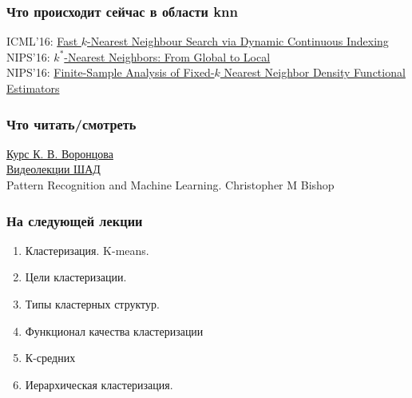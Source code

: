 \documentclass[10pt]{beamer}
\begin{document}
\begin{frame}\frametitle{Что происходит сейчас в области knn}
  ICML'16: \href{http://jmlr.org/proceedings/papers/v48/lic16.pdf}{Fast $k$-Nearest Neighbour Search via Dynamic Continuous Indexing}\\
  \bigbreak
  NIPS'16: \href{http://papers.nips.cc/paper/6373-k-nearest-neighbors-from-global-to-local.pdf}{$k^\ast$-Nearest Neighbors: From Global to Local}\\
  \bigbreak
  NIPS'16: \href{http://papers.nips.cc/paper/6123-finite-sample-analysis-of-fixed-k-nearest-neighbor-density-functional-estimators.pdf}{Finite-Sample Analysis of Fixed-$k$ Nearest Neighbor Density Functional Estimators}\\
\end{frame}

\begin{frame}\frametitle{Что читать/смотреть}
	\href{http://www.machinelearning.ru/wiki/images/6/6d/Voron-ML-1.pdf}{Курс К. В. Воронцова}\\
	\href{https://yandexdataschool.ru/edu-process/courses/machine-learning}{Видеолекции ШАД}\\
	Pattern Recognition and Machine Learning. Christopher M Bishop
\end{frame}

\begin{frame}\frametitle{На следующей лекции}
	\begin{enumerate} [--]
		\item Кластеризация.  K-means.
		\item Цели кластеризации.
		\item Типы кластерных структур.
		\item Функционал качества кластеризации
		\item К-средних
		\item Иерархическая кластеризация.
	\end{enumerate}
\end{frame}
\end{document}
